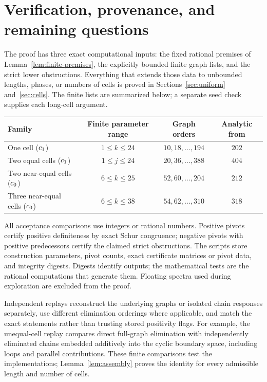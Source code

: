 \section{Verification, provenance, and remaining questions}
\label{sec:verification}

The proof has three exact computational inputs: the fixed rational
premises of Lemma~\ref{lem:finite-premises}, the explicitly bounded finite
graph lists, and the strict lower obstructions. Everything that extends
those data to unbounded lengths, phases, or numbers of cells is proved in
Sections~\ref{sec:uniform} and~\ref{sec:cells}.
The finite lists are summarized below; a separate seed check supplies each
long-cell argument.
\begin{center}
\small
\begin{tabular}{lccc}
\toprule
Family & Finite parameter range & Graph orders & Analytic from\\
\midrule
One cell ($c_1$) & $1\le k\le24$ & $10,18,\ldots,194$ & $202$\\
Two equal cells ($c_1$) & $1\le j\le24$ & $20,36,\ldots,388$ & $404$\\
Two near-equal cells ($c_0$) & $6\le k\le25$ & $52,60,\ldots,204$ & $212$\\
Three near-equal cells ($c_0$) & $6\le k\le38$ & $54,62,\ldots,310$ & $318$\\
\bottomrule
\end{tabular}
\end{center}

All acceptance comparisons use integers or rational numbers. Positive
pivots certify positive definiteness by exact Schur congruence; negative
pivots with positive predecessors certify the claimed strict obstructions.
The scripts store construction parameters, pivot counts, exact certificate
matrices or pivot data, and integrity digests. Digests identify outputs;
the mathematical tests are the rational computations that generate them.
Floating spectra used during exploration are excluded from the proof.

Independent replays reconstruct the underlying graphs or isolated chain
responses separately, use different elimination orderings where applicable,
and match the exact statements rather than trusting stored positivity flags.
For example, the unequal-cell replay compares direct full-graph elimination
with independently eliminated chains embedded additively into the cyclic
boundary space, including loops and parallel contributions. These finite
comparisons test the implementations; Lemma~\ref{lem:assembly} proves the
identity for every admissible length and number of cells.

